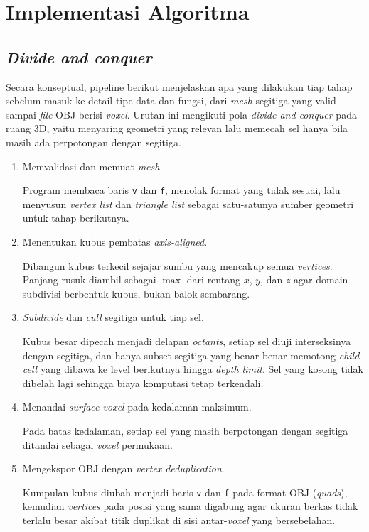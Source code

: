 \documentclass[11pt,a4paper]{article}
\begin{document}
\section{Implementasi Algoritma}

\subsection{\textit{Divide and conquer}}

Secara konseptual, pipeline berikut menjelaskan apa yang dilakukan tiap tahap sebelum masuk ke detail tipe data dan fungsi, dari \textit{mesh} segitiga yang valid sampai \textit{file} OBJ berisi \textit{voxel}. Urutan ini mengikuti pola \textit{divide and conquer} pada ruang 3D, yaitu menyaring geometri yang relevan lalu memecah sel hanya bila masih ada perpotongan dengan segitiga.

\begin{enumerate}[leftmargin=*, itemsep=0.75\baselineskip]
    \item Memvalidasi dan memuat \textit{mesh}.

    Program membaca baris \texttt{v} dan \texttt{f}, menolak format yang tidak sesuai, lalu menyusun \textit{vertex list} dan \textit{triangle list} sebagai satu-satunya sumber geometri untuk tahap berikutnya.

    \item Menentukan kubus pembatas \textit{axis-aligned}.

    Dibangun kubus terkecil sejajar sumbu yang mencakup semua \textit{vertices}. Panjang rusuk diambil sebagai $\max$ dari rentang $x$, $y$, dan $z$ agar domain subdivisi berbentuk kubus, bukan balok sembarang.

    \item \textit{Subdivide} dan \textit{cull} segitiga untuk tiap sel.

    Kubus besar dipecah menjadi delapan \textit{octants}, setiap sel diuji interseksinya dengan segitiga, dan hanya subset segitiga yang benar-benar memotong \textit{child cell} yang dibawa ke level berikutnya hingga \textit{depth limit}. Sel yang kosong tidak dibelah lagi sehingga biaya komputasi tetap terkendali.

    \item Menandai \textit{surface voxel} pada kedalaman maksimum.

    Pada batas kedalaman, setiap sel yang masih berpotongan dengan segitiga ditandai sebagai \textit{voxel} permukaan.

    \item Mengekspor OBJ dengan \textit{vertex deduplication}.

    Kumpulan kubus diubah menjadi baris \texttt{v} dan \texttt{f} pada format OBJ (\textit{quads}), kemudian \textit{vertices} pada posisi yang sama digabung agar ukuran berkas tidak terlalu besar akibat titik duplikat di sisi antar-\textit{voxel} yang bersebelahan.
\end{enumerate}
\end{document}
